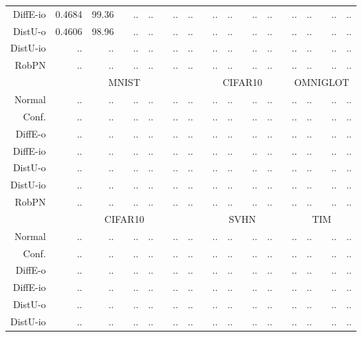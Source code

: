 \begin{table*}
\begin{tiny}
\begin{tabular}{@{}rrrcrrcrrcrrcrrcrrcrr@{}}
			DiffE-io   & 0.4684 & 99.36 & & .. & .. & & .. & .. & & .. & .. & & .. & .. & & .. & .. & & .. & .. \\
			DistU-o    & 0.4606 & 98.96 & & .. & .. & & .. & .. & & .. & .. & & .. & .. & & .. & .. & & .. & .. \\
			DistU-io   & .. & .. & & .. & .. & & .. & .. & & .. & .. & & .. & .. & & .. & .. & & .. & .. \\
			RobPN      & .. & .. & & .. & .. & & .. & .. & & .. & .. & & .. & .. & & .. & .. & & .. & .. \\
			\midrule
			& \multicolumn{8}{c}{MNIST} & & \multicolumn{5}{c}{CIFAR10} & & \multicolumn{5}{c}{OMNIGLOT} \\
			Normal     & .. & .. & & .. & .. & & .. & .. & & .. & .. & & .. & .. & & .. & .. & & .. & .. \\
			Conf.      & .. & .. & & .. & .. & & .. & .. & & .. & .. & & .. & .. & & .. & .. & & .. & .. \\
			DiffE-o    & .. & .. & & .. & .. & & .. & .. & & .. & .. & & .. & .. & & .. & .. & & .. & .. \\
			DiffE-io   & .. & .. & & .. & .. & & .. & .. & & .. & .. & & .. & .. & & .. & .. & & .. & .. \\
			DistU-o    & .. & .. & & .. & .. & & .. & .. & & .. & .. & & .. & .. & & .. & .. & & .. & .. \\
			DistU-io   & .. & .. & & .. & .. & & .. & .. & & .. & .. & & .. & .. & & .. & .. & & .. & .. \\
			RobPN      & .. & .. & & .. & .. & & .. & .. & & .. & .. & & .. & .. & & .. & .. & & .. & .. \\
			\midrule
			& \multicolumn{8}{c}{CIFAR10} & & \multicolumn{5}{c}{SVHN} & & \multicolumn{5}{c}{TIM} \\
			Normal     & .. & .. & & .. & .. & & .. & .. & & .. & .. & & .. & .. & & .. & .. & & .. & .. \\
			Conf.      & .. & .. & & .. & .. & & .. & .. & & .. & .. & & .. & .. & & .. & .. & & .. & .. \\
			DiffE-o    & .. & .. & & .. & .. & & .. & .. & & .. & .. & & .. & .. & & .. & .. & & .. & .. \\
			DiffE-io   & .. & .. & & .. & .. & & .. & .. & & .. & .. & & .. & .. & & .. & .. & & .. & .. \\
			DistU-o    & .. & .. & & .. & .. & & .. & .. & & .. & .. & & .. & .. & & .. & .. & & .. & .. \\
			DistU-io   & .. & .. & & .. & .. & & .. & .. & & .. & .. & & .. & .. & & .. & .. & & .. & .. \\

\end{tabular}
\end{tiny}
\end{table*}
